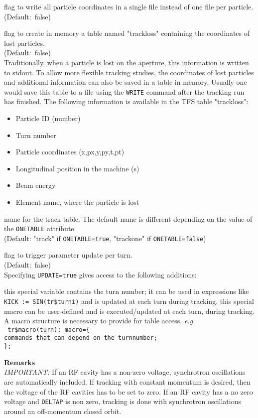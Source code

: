 \begin{madlist}
   flag to write all particle coordinates in a single
  file instead of one file per particle. \\ (Default:~false)

   flag to create in memory a table named "trackloss"
  containing the coordinates of lost particles.\\
  (Default:~false) \\
  Traditionally, when a particle is lost on the aperture, this information
  is written to stdout. To allow more flexible tracking studies, the
  coordinates of lost particles and additional information can also be
  saved in a table in memory. Usually one would save this table to a
  file using the \texttt{WRITE} command after the tracking run has
  finished. The following information is available in the TFS table
  "trackloss":          
  \begin{itemize}
  \item Particle ID (number)
  \item Turn number
  \item Particle coordinates (x,px,y,py,t,pt)
  \item Longitudinal position in the machine (s)
  \item Beam energy
  \item Element name, where the particle is lost
  \end{itemize}

   name for the track table. The default name is different
  depending on the value of the \texttt{ONETABLE} attribute. \\ 
  (Default: "track" if \texttt{ONETABLE=true}, "trackone" if \texttt{ONETABLE=false})

   flag to trigger parameter update per turn. \\  
  (Default:~false) \\
  Specifying \texttt{UPDATE=true} gives access to the following additions:   
  \begin{madlist}
     this special variable contains the turn number;
    it can be used in expressions like \texttt{KICK := SIN(tr\$turni)} and is
    updated at each turn during tracking.     
      this special macro can be
    user-defined and is executed/updated at each turn, during tracking.
    A macro structure is necessary to provide for table access.
    \textsl{e.g.} \\ 
    \texttt{
      tr\$macro(turn): macro=\{ \\
      commands that can depend on the turnnumber;\\
      \};
    } 
  \end{madlist}

\end{madlist}

\textbf{Remarks}\\
\emph{IMPORTANT:} If an RF cavity has a non-zero voltage, synchrotron
oscillations are automatically included. If tracking with constant
momentum is desired, then the voltage of the RF cavities has to be set
to zero. If an RF cavity has a no zero voltage and \texttt{DELTAP} is non zero, 
tracking is done with synchrotron oscillations around an off-momentum
closed orbit.